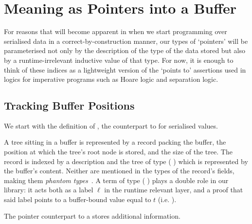\section{Meaning as Pointers into a Buffer}\label{sec:pointers}

For reasons that will become apparent in 
when we start programming over serialised data in a correct-by-construction
manner, our types of `pointers' will be parameterised not only
by the description of the type of the data stored but also by a
runtime-irrelevant inductive value of that type.
%
For now, it is enough to think of these indices as a lightweight
version of the `points to' assertions used in logics for imperative
programs such as Hoare logic and separation logic.

\subsection{Tracking Buffer Positions}

We start with the definition of ,
the counterpart to  for serialised values.


A tree sitting in a buffer is represented
by a record packing the buffer, the position at which the tree's
root node is stored, and the size of the tree.
%
The record is indexed by  a  description
and  the tree of type ( )
which is represented by the buffer's content.
Neither are mentioned in the types of the record's fields, making them
\emph{phantom types}~\citep{DBLP:conf/dsl/LeijenM99}.
%
A term of type (  )
plays a double role in our library: it acts both as a label $\ell$ in
the runtime relevant layer, and a proof that said label points to a
buffer-bound value equal to $t$
(i.e. ).



The pointer counterpart to a  stores
additional information.


